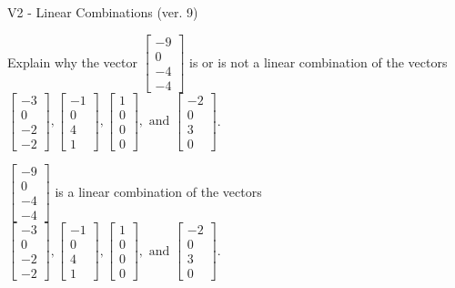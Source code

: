 \begin{exercise}
  \begin{exerciseTitle}V2 - Linear Combinations (ver. 9)\end{exerciseTitle}
  \begin{exerciseStatement}
    Explain why the vector \(\left[\begin{array}{c}
-9 \\
0 \\
-4 \\
-4
\end{array}\right]\)  is or is not a linear 
	combination of the vectors \(\left[\begin{array}{c}
-3 \\
0 \\
-2 \\
-2
\end{array}\right] , \left[\begin{array}{c}
-1 \\
0 \\
4 \\
1
\end{array}\right] , \left[\begin{array}{c}
1 \\
0 \\
0 \\
0
\end{array}\right] , \text{ and } \left[\begin{array}{c}
-2 \\
0 \\
3 \\
0
\end{array}\right]\).
	


  \end{exerciseStatement}
  \begin{exerciseAnswer}
   \(\left[\begin{array}{c}
-9 \\
0 \\
-4 \\
-4
\end{array}\right]\) 
  	 is  
	a linear combination of the vectors \(\left[\begin{array}{c}
-3 \\
0 \\
-2 \\
-2
\end{array}\right] , \left[\begin{array}{c}
-1 \\
0 \\
4 \\
1
\end{array}\right] , \left[\begin{array}{c}
1 \\
0 \\
0 \\
0
\end{array}\right] , \text{ and } \left[\begin{array}{c}
-2 \\
0 \\
3 \\
0
\end{array}\right]\).


\end{exerciseAnswer}
\end{exercise}
